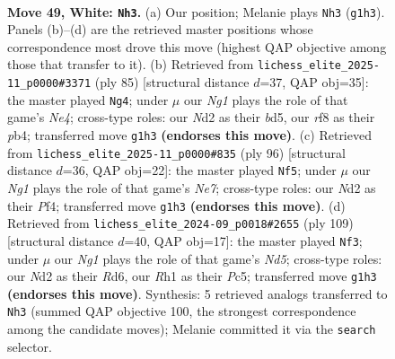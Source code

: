 \documentclass[11pt]{article}
\begin{document}
\clearpage

\begin{figure}[p]\centering
\begin{subfigure}{0.46\textwidth}\centering
\resizebox{\linewidth}{!}{%
\newchessgame
\chessboard[
  setfen={5r2/7k/1pb5/p1p1r3/8/2P2pP1/1K1N3P/6NR w - - 4 49},
  showmover=false,
  pgfstyle=straightmove, color=movearrow, markmove={g1-h3}
]}
\caption{}
\end{subfigure}\hfill
\begin{subfigure}{0.46\textwidth}\centering
\resizebox{\linewidth}{!}{%
\newchessgame
\chessboard[
  setfen={4r3/p6p/1pP5/3Bn1k1/1P6/P4p2/2R5/5K2 b - - 0 43},
  showmover=false,
  pgfstyle=straightmove, color=movearrow, markmove={e5-g4}
]}
\caption{}
\end{subfigure}
\\[4pt]
\begin{subfigure}{0.46\textwidth}\centering
\resizebox{\linewidth}{!}{%
\newchessgame
\chessboard[
  setfen={3r4/R3N1pk/5p1p/3p3P/5P2/2b3P1/6K1/8 w - - 6 49},
  showmover=false,
  pgfstyle=straightmove, color=movearrow, markmove={e7-f5}
]}
\caption{}
\end{subfigure}\hfill
\begin{subfigure}{0.46\textwidth}\centering
\resizebox{\linewidth}{!}{%
\newchessgame
\chessboard[
  setfen={8/6k1/1p1r3p/1PpPR3/2Bn3P/8/8/3K4 b - - 4 55},
  showmover=false,
  pgfstyle=straightmove, color=movearrow, markmove={d4-f3}
]}
\caption{}
\end{subfigure}
\caption{\textbf{Move 49, White: \texttt{Nh3}.} (a) Our position; Melanie plays \texttt{Nh3} (\texttt{g1h3}). Panels (b)--(d) are the retrieved master positions whose correspondence most drove this move (highest QAP objective among those that transfer to it). (b) Retrieved from \texttt{lichess\_elite\_2025-11\_p0000\#3371} (ply 85) [structural distance $d$=37, QAP obj=35]: the master played \texttt{Ng4}; under $\mu$ our \emph{Ng1} plays the role of that game's \emph{Ne4}; cross-type roles: our \emph{N}d2 as their \emph{b}d5, our \emph{r}f8 as their \emph{p}b4; transferred move \texttt{g1h3} \textbf{(endorses this move)}. (c) Retrieved from \texttt{lichess\_elite\_2025-11\_p0000\#835} (ply 96) [structural distance $d$=36, QAP obj=22]: the master played \texttt{Nf5}; under $\mu$ our \emph{Ng1} plays the role of that game's \emph{Ne7}; cross-type roles: our \emph{N}d2 as their \emph{P}f4; transferred move \texttt{g1h3} \textbf{(endorses this move)}. (d) Retrieved from \texttt{lichess\_elite\_2024-09\_p0018\#2655} (ply 109) [structural distance $d$=40, QAP obj=17]: the master played \texttt{Nf3}; under $\mu$ our \emph{Ng1} plays the role of that game's \emph{Nd5}; cross-type roles: our \emph{N}d2 as their \emph{R}d6, our \emph{R}h1 as their \emph{P}c5; transferred move \texttt{g1h3} \textbf{(endorses this move)}. Synthesis: 5 retrieved analogs transferred to \texttt{Nh3} (summed QAP objective 100, the strongest correspondence among the candidate moves); Melanie committed it via the \texttt{search} selector.}
\label{fig:thought-m96}
\end{figure}
\end{document}
